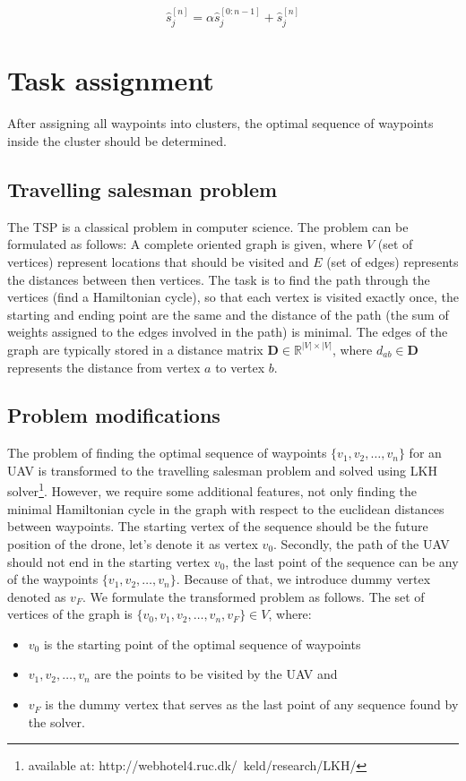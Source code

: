 \begin{equation}
  \hat{s}_{j}^{[n]} = \alpha \hat{s}_{j}^{[0:n-1]}+\hat{s}_{j}^{[n]}
\end{equation}

\section{Task assignment}

After assigning all waypoints into clusters, the optimal sequence of waypoints inside the cluster should be determined.

\subsection{Travelling salesman problem}
The \ac{TSP} is a classical problem in computer science. 
The problem can be formulated as follows: 
A complete oriented graph is given, where $V$ (set of vertices) represent locations that should be visited and $E$ (set of edges) represents the distances between then vertices.
The task is to find the path through the vertices (find a Hamiltonian cycle), so that each vertex is visited exactly once, the starting and ending point are the same and the distance of the path (the sum of weights assigned to the edges involved in the path) is minimal.
The edges of the graph are typically stored in a distance matrix $\mathbf{D}\in \mathbb{R}^{\left|V\right|\times\left|V\right|}$, where $d_{ab} \in \mathbf{D}$ represents the distance from vertex $a$ to vertex $b$.

\subsection{Problem modifications}
The problem of finding the optimal sequence of waypoints $\{v_{1}, v_{2}, \dots , v_{n}\}$ for an \ac{UAV} is transformed to the travelling salesman problem and solved using LKH solver\footnote{available at: http://webhotel4.ruc.dk/~keld/research/LKH/}.
However, we require some additional features, not only finding the minimal Hamiltonian cycle in the graph with respect to the euclidean distances between waypoints.
The starting vertex of the sequence should be the future position of the drone, let's denote it as vertex $v_{0}$.
Secondly, the path of the \ac{UAV} should not end in the starting vertex $v_{0}$, the last point of the sequence can be any of the waypoints $\{v_{1}, v_{2}, \dots, v_{n}\}$.
Because of that, we introduce dummy vertex denoted as $v_{F}$.
We formulate the transformed problem as follows.
The set of vertices of the graph is $\{v_{0}, v_{1}, v_{2}, \dots,v_{n}, v_{F}\} \in V$, where: 
\begin{itemize}
  \item $v_{0}$ is the starting point of the optimal sequence of waypoints
  \item $v_{1}, v_{2}, \dots, v_{n}$ are the points to be visited by the \ac{UAV} and   
  \item $v_{F}$ is the dummy vertex that serves as the last point of any sequence found by the solver.
\end{itemize}

